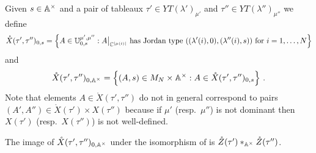 \documentclass[draft]{article} %
\begin{document}
% 
Given $s\in\Ax$ and a pair of tableaux $\tau'\in YT(\lambda')_{\mu'}$ and $\tau''\in YT(\lambda'')_{\mu''}$ we define
% 
\begin{equation*}
    \mathring X(\tau',\tau'')_{0,s} 
    = \left\{A\in\UU_{0,s}^{\mu',\mu''} : A \big|_{\CC^{|\mu(i)|}} 
    \text{ has Jordan type } ((\lambda'(i), 0), (\lambda''(i), s))
    \text{ for } i=1,\dots,N\right\}
\end{equation*}
% 
% 
and
\begin{equation*}
        \mathring X(\tau',\tau'')_{0,\AA^\times} = 
    \left\{
        (A,s)\in M_N \times \AA^\times: 
        A \in \mathring X(\tau',\tau'')_{0,s} 
    \right\}\,.
\end{equation*}
% 
Note that elements $A\in\mathring X(\tau',\tau'')$ do not in general correspond to pairs $(A',A'')\in\mathring X(\tau')\times X(\tau'')$ because if $\mu'$ (resp.\ $\mu''$) is not dominant then $X(\tau')$ (resp.\ $X(\tau'')$) is not well-defined. 

% 
% 
\begin{proposition}
    \label{pr:XttZtt}
    The image of $\mathring X(\tau',\tau'')_{0,\AA^\times}$ under the isomorphism of  is $\mathring Z(\tau')\ast_{\AA^\times} \mathring Z(\tau'')$. 
\end{proposition}
% 
\end{document}
